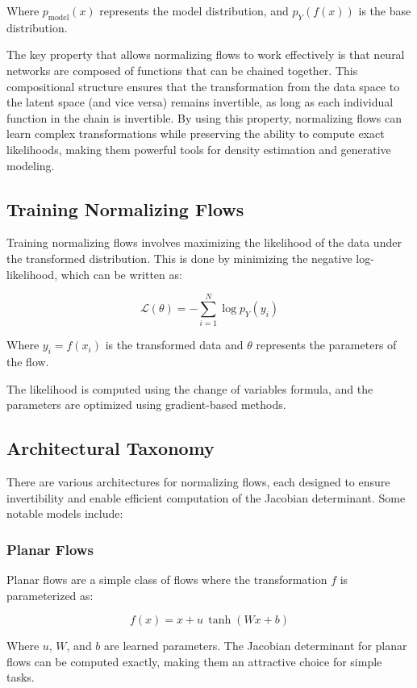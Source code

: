 \documentclass{article}
\begin{document}
Where \( p_{\text{model}}(x) \) represents the model distribution, and \( p_Y(f(x)) \) is the base distribution.

The key property that allows normalizing flows to work effectively is that neural networks are composed of functions that can be chained together. This compositional structure ensures that the transformation from the data space to the latent space (and vice versa) remains invertible, as long as each individual function in the chain is invertible. By using this property, normalizing flows can learn complex transformations while preserving the ability to compute exact likelihoods, making them powerful tools for density estimation and generative modeling.

\subsection{Training Normalizing Flows}
Training normalizing flows involves maximizing the likelihood of the data under the transformed distribution. This is done by minimizing the negative log-likelihood, which can be written as:

\[
\mathcal{L}(\theta) = -\sum_{i=1}^N \log p_Y(y_i)
\]

Where \( y_i = f(x_i) \) is the transformed data and \( \theta \) represents the parameters of the flow.

The likelihood is computed using the change of variables formula, and the parameters are optimized using gradient-based methods.

\subsection{Architectural Taxonomy}
There are various architectures for normalizing flows, each designed to ensure invertibility and enable efficient computation of the Jacobian determinant. Some notable models include:

\subsubsection{Planar Flows}
Planar flows are a simple class of flows where the transformation \( f \) is parameterized as:

\[
f(x) = x + u \, \tanh(Wx + b)
\]

Where \( u \), \( W \), and \( b \) are learned parameters. The Jacobian determinant for planar flows can be computed exactly, making them an attractive choice for simple tasks.
\end{document}
